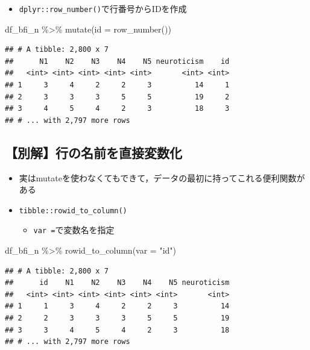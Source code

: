 \documentclass[
  xelatex,ja=standard, b5paper]{bxjsbook}
\newenvironment{Shaded}{\begin{snugshade}}{\end{snugshade}}
\newcommand{\AttributeTok}[1]{\textcolor[rgb]{0.77,0.63,0.00}{#1}}
\newcommand{\FunctionTok}[1]{\textcolor[rgb]{0.00,0.00,0.00}{#1}}
\newcommand{\NormalTok}[1]{#1}
\newcommand{\SpecialCharTok}[1]{\textcolor[rgb]{0.00,0.00,0.00}{#1}}
\newcommand{\StringTok}[1]{\textcolor[rgb]{0.31,0.60,0.02}{#1}}
\providecommand{\tightlist}{%
  \setlength{\itemsep}{0pt}\setlength{\parskip}{0pt}}
\begin{document}
\begin{itemize}
\tightlist
\item
  \texttt{dplyr::row\_number()}で行番号からIDを作成
\end{itemize}

\begin{Shaded}
\begin{Highlighting}[]
\NormalTok{df\_bfi\_n }\SpecialCharTok{\%\textgreater{}\%} 
  \FunctionTok{mutate}\NormalTok{(}\AttributeTok{id =} \FunctionTok{row\_number}\NormalTok{())}
\end{Highlighting}
\end{Shaded}

\begin{verbatim}
## # A tibble: 2,800 x 7
##      N1    N2    N3    N4    N5 neuroticism    id
##   <int> <int> <int> <int> <int>       <int> <int>
## 1     3     4     2     2     3          14     1
## 2     3     3     3     5     5          19     2
## 3     4     5     4     2     3          18     3
## # ... with 2,797 more rows
\end{verbatim}

\hypertarget{mu-seq-other}{%
\subsection{【別解】行の名前を直接変数化}\label{mu-seq-other}}

\begin{itemize}
\tightlist
\item
  実はmutateを使わなくてもできて，データの最初に持ってこれる便利関数がある
\item
  \texttt{tibble::rowid\_to\_column()}

  \begin{itemize}
  \tightlist
  \item
    \texttt{var\ =}で変数名を指定
  \end{itemize}
\end{itemize}

\begin{Shaded}
\begin{Highlighting}[]
\NormalTok{df\_bfi\_n }\SpecialCharTok{\%\textgreater{}\%} 
  \FunctionTok{rowid\_to\_column}\NormalTok{(}\AttributeTok{var =} \StringTok{"id"}\NormalTok{)}
\end{Highlighting}
\end{Shaded}

\begin{verbatim}
## # A tibble: 2,800 x 7
##      id    N1    N2    N3    N4    N5 neuroticism
##   <int> <int> <int> <int> <int> <int>       <int>
## 1     1     3     4     2     2     3          14
## 2     2     3     3     3     5     5          19
## 3     3     4     5     4     2     3          18
## # ... with 2,797 more rows
\end{verbatim}
\end{document}
